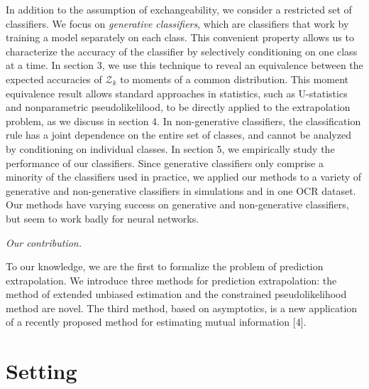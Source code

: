 \documentclass{article}
\begin{document}
In addition to the assumption of exchangeability, we consider a restricted set of classifiers.
We focus on \emph{generative classifiers}, which are classifiers that work by training
a model separately on each class.  This convenient property 
allows us to characterize the accuracy of the classifier by selectively conditioning on one class at a time.
In section 3, we use this technique to reveal an equivalence between 
the expected accuracies of $\mathcal{Z}_k$ to moments of a common distribution.
This moment equivalence result allows standard approaches in statistics, such as U-statistics and
nonparametric pseudolikelilood, to be directly applied to the extrapolation problem, as we discuss in section 4.
In non-generative classifiers, the classification rule has a joint dependence on the entire set of classes,
and cannot be analyzed by conditioning on individual classes.
In section 5, we empirically study the performance of our classifiers.
Since generative classifiers only comprise a minority of the classifiers used in practice,
we applied our methods to a variety of generative and non-generative classifiers
in simulations and in one OCR dataset.  Our methods have varying success on generative and non-generative classifiers,
but seem to work badly for neural networks.

\noindent\emph{Our contribution.}

To our knowledge, we are the first to formalize the problem of prediction extrapolation.
We introduce three methods for prediction extrapolation: the method of extended unbiased estimation
and the constrained pseudolikelihood method are novel.  The third method, based
on asymptotics, is a new application of a recently proposed method 
for estimating mutual information [4].

\section{Setting}
\end{document}
